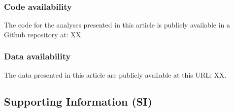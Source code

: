 \documentclass[9pt,twocolumn,twoside]{pnas-new}
\begin{document}
\subsubsection*{Code availability} The code for the analyses presented in this article is publicly available in a Github repository at: XX.

\subsubsection*{Data availability} The data presented in this article are publicly available at this URL: XX.

\subsection*{Supporting Information (SI)}

\end{document}

